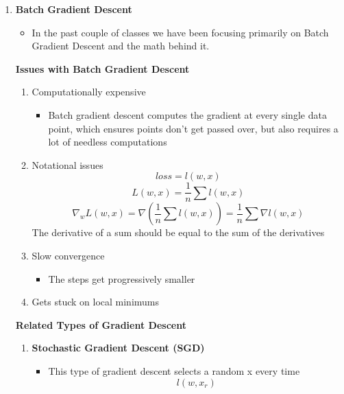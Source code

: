 \begin{enumerate}
    \item \textbf{Batch Gradient Descent}
    \begin{itemize}
        \item In the past couple of classes we have been focusing primarily on Batch Gradient Descent and the math behind it.
    \end{itemize} 
    \textbf{Issues with Batch Gradient Descent}
    \begin{enumerate}
        \item Computationally expensive
        \begin{itemize}
            \item Batch gradient descent computes the gradient at every single data point, which ensures points don't get passed over, but also requires a lot of needless computations
        \end{itemize} 
        \item Notational issues
        \[
        loss = l(w,x)
        \]
        \[
        L(w,x) = \frac{1}{n} \sum l(w,x)
        \]
        \[
        \nabla_w L(w,x)=\nabla (\frac{1}{n} \sum l(w,x)) = \frac{1}{n} \sum \nabla l(w,x)
        \]
        The derivative of a sum should be equal to the sum of the derivatives
        \item Slow convergence
        \begin{itemize}
            \item The steps get progressively smaller
        \end{itemize}
        \item Gets stuck on local minimums
    \end{enumerate}
    \textbf{Related Types of Gradient Descent}
    \begin{enumerate}
        \item \textbf{Stochastic Gradient Descent (SGD)}
        \begin{itemize}
            \item This type of gradient descent selects a random x every time
            \[
            l(w,x_r)
            \]
        \end{itemize}


\end{enumerate}
\end{enumerate}
